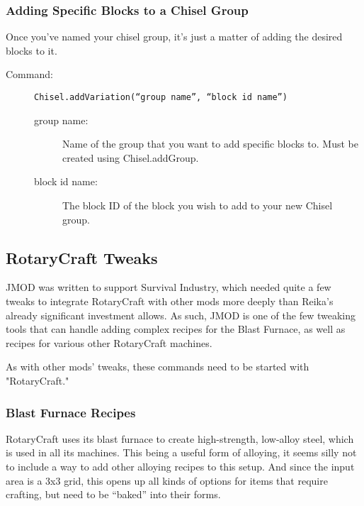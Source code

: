 \documentclass[letterpaper,titlepage,12pt]{article}
\begin{document}
\subsubsection{Adding Specific Blocks to a Chisel Group}

Once you've named your chisel group, it's just a matter of adding the desired blocks to it.

\begin{description}
\item[Command:] \texttt{Chisel.addVariation(``group name'', ``block id name'')}
\begin{description}
\item [group name:] Name of the group that you want to add specific blocks to.  Must be created using Chisel.addGroup.
\item [block id name:] The block ID of the block you wish to add to your new Chisel group.
\end{description}
\end{description}

\subsection{RotaryCraft Tweaks}

JMOD was written to support Survival Industry, which needed quite a few tweaks to integrate RotaryCraft with other mods more deeply than Reika's already significant investment allows.  As such, JMOD is one of the few tweaking tools that can handle adding complex recipes for the Blast Furnace, as well as recipes for various other RotaryCraft machines.

As with other mods' tweaks, these commands need to be started with "RotaryCraft."

\subsubsection{Blast Furnace Recipes}

RotaryCraft uses its blast furnace to create high-strength, low-alloy steel, which is used in all its machines.  This being a useful form of alloying, it seems silly not to include a way to add other alloying recipes to this setup.  And since the input area is a 3x3 grid, this opens up all kinds of options for items that require crafting, but need to be ``baked'' into their forms.
\end{document}
